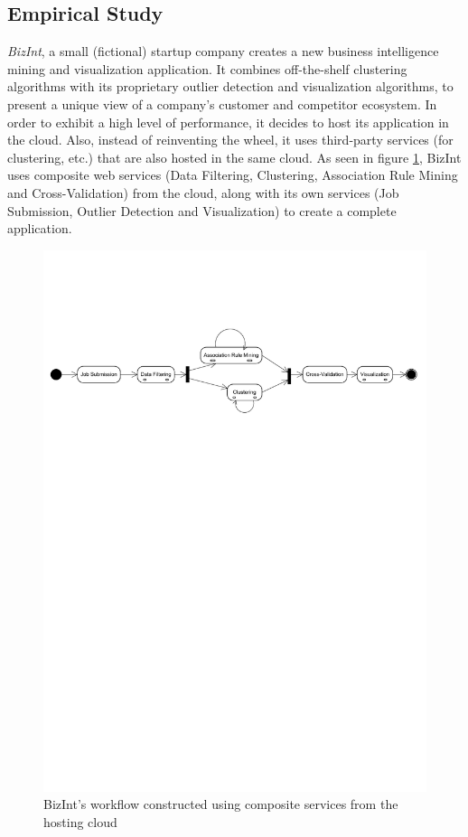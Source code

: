 \documentclass[10pt,journal,compsoc]{IEEEtran}
\begin{document}
\subsection{Empirical Study}
\textit{BizInt}, a small (fictional) startup company creates a new business intelligence mining and visualization application.  It combines off-the-shelf clustering algorithms with its proprietary outlier detection and visualization algorithms, to present a unique view of a company's customer and competitor ecosystem. In order to exhibit a high level of performance, it decides to host its application in the cloud. Also, instead of reinventing the wheel, it uses third-party services (for clustering, etc.) that are also hosted in the same cloud. As seen in figure \ref{fig:BizIntWorkflow}, BizInt uses composite web services (Data Filtering, Clustering, Association Rule Mining and Cross-Validation) from the cloud, along with its own services (Job Submission, Outlier Detection and Visualization) to create a complete application.
\begin{figure}%
\includegraphics[scale=0.4, clip, trim=0 20cm 0 4cm]{drawings/BizIntWorkflow.pdf}%
\caption{BizInt's workflow constructed using composite services from the hosting cloud\label{fig:BizIntWorkflow}}%
\end{figure}
\end{document}
